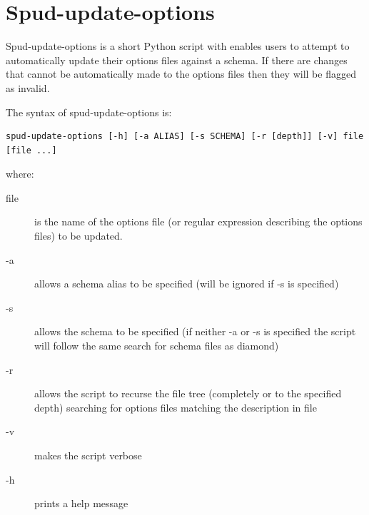 \documentclass[a4paper, 11pt]{book}
\begin{document}
\section{Spud-update-options}

Spud-update-options is a short Python script with enables users to attempt to automatically update their options files against a
schema.  If there are changes that cannot be automatically made to the options files then they will be flagged as invalid.

The syntax of spud-update-options is:
\begin{verbatim}
spud-update-options [-h] [-a ALIAS] [-s SCHEMA] [-r [depth]] [-v] file [file ...]
\end{verbatim}
where:
\begin{description}
\item[file] is the name of the options file (or regular expression describing the options files) to be updated.
\item[-a] allows a schema alias to be specified (will be ignored if -s is specified)
\item[-s] allows the schema to be specified (if neither -a or -s is specified the script will follow the same search for schema
files as diamond)
\item[-r] allows the script to recurse the file tree (completely or to the specified depth) searching for options files matching the description in file
\item[-v] makes the script verbose
\item[-h] prints a help message
\end{description}
\end{document}
